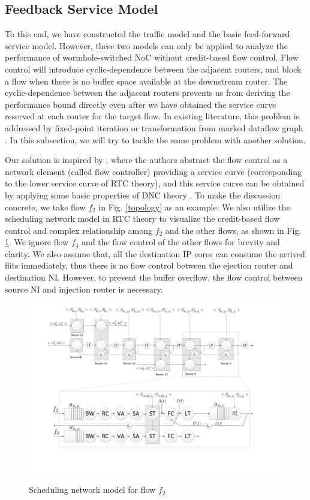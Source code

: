 \documentclass[preprint]{elsarticle}
\begin{document}
\subsection{Feedback Service Model}\label{flowcontrol}
To this end, we have constructed the traffic model and the basic feed-forward service model. However, these two models can only be applied to analyze the performance of wormhole-switched NoC without credit-based flow control. Flow control will introduce cyclic-dependence between the adjacent routers, and block a flow when there is no buffer space available at the downstream router. The cyclic-dependence between the adjacent routers prevents us from deriving the performance bound directly even after we have obtained the service curve reserved at each router for the target flow. In existing literature, this problem is addressed by fixed-point iteration \cite{schioler2005network} or transformation from marked dataflow graph \cite{Thiele:2009:MPA:1629335.1629353}. In this subsection, we will try to tackle the same problem with another solution.

Our solution is inspired by \cite{qian2009analysis}, where the authors abstract the flow control as a network element (called flow controller) providing a service curve (corresponding to the lower service curve of RTC theory), and this service curve can be obtained by applying some basic properties of DNC theory \cite{Boudec2001Network}. To make the discussion concrete, we take flow $f_2$ in Fig. \ref{topology} as an example. We also utilize the scheduling network model \cite{1253607} in RTC theory to visualize the credit-based flow control and complex relationship among $f_2$ and the other flows, as shown in Fig. \ref{f2}. We ignore flow $f_4$ and the flow control of the other flows for brevity and clarity. We also assume that, all the destination IP cores can consume the arrived flits immediately, thus there is no flow control between the ejection router and destination NI. However, to prevent the buffer overflow, the flow control between source NI and injection router is necessary.
\begin{figure}
  \centering
  \includegraphics[scale=0.35]{figures/f2.pdf}\\
  \caption{Scheduling network model for flow $f_2$}\label{f2}
\end{figure}
\end{document}
